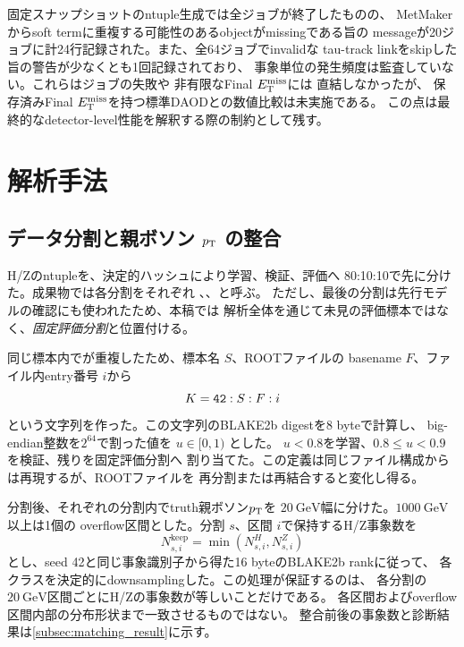 \documentclass[xelatex,ja=standard,a4paper,10pt,twocolumn]{bxjsarticle}
\begin{document}
固定スナップショットのntuple生成では全ジョブが終了したものの、
MetMakerからsoft termに重複する可能性のあるobjectがmissingである旨の
messageが20ジョブに計24行記録された。また、全64ジョブでinvalidな
tau-track linkをskipした旨の警告が少なくとも1回記録されており、
事象単位の発生頻度は監査していない。これらはジョブの失敗や
非有限なFinal \(E_{\mathrm{T}}^{\mathrm{miss}}\)には
直結しなかったが、
保存済みFinal \(E_{\mathrm{T}}^{\mathrm{miss}}\)を持つ標準DAODとの数値比較は未実施である。
この点は最終的なdetector-level性能を解釈する際の制約として残す。

\section{解析手法}
\label{sec:method}

\subsection{データ分割と親ボソン \(p_{\mathrm{T}}\) の整合}
\label{subsec:matching}

H/Zのntupleを、決定的ハッシュにより学習、検証、評価へ
80:10:10で先に分けた。成果物では各分割をそれぞれ
、、と呼ぶ。
ただし、最後の分割は先行モデルの確認にも使われたため、本稿では
解析全体を通じて未見の評価標本ではなく、\emph{固定評価分割}と位置付ける。

同じ標本内でが重複したため、標本名 \(S\)、ROOTファイルの
basename \(F\)、ファイル内entry番号 \(i\)から
\begin{equation}
  K=\code{42}:S:F:i
  \label{eq:split_key}
\end{equation}
という文字列を作った。この文字列のBLAKE2b digestを8 byteで計算し、
big-endian整数を\(2^{64}\)で割った値を \(u\in[0,1)\) とした。
\(u<0.8\)を学習、\(0.8\leq u<0.9\)を検証、残りを固定評価分割へ
割り当てた。この定義は同じファイル構成からは再現するが、ROOTファイルを
再分割または再結合すると変化し得る。

分割後、それぞれの分割内でtruth親ボソン\(p_{\mathrm{T}}\)を
\(\SI{20}{\GeV}\)幅に分けた。\(\SI{1000}{\GeV}\)以上は1個の
overflow区間とした。分割 \(s\)、区間 \(i\)で保持するH/Z事象数を
\begin{equation}
  N^{\mathrm{keep}}_{s,i}
  = \min\left(N^{H}_{s,i},N^{Z}_{s,i}\right)
  \label{eq:pt_matching}
\end{equation}
とし、seed 42と同じ事象識別子から得た16 byteのBLAKE2b rankに従って、
各クラスを決定的にdownsamplingした。この処理が保証するのは、
各分割の\(\SI{20}{\GeV}\)区間ごとにH/Zの事象数が等しいことだけである。
各区間およびoverflow区間内部の分布形状まで一致させるものではない。
整合前後の事象数と診断結果は\cref{subsec:matching_result}に示す。
\end{document}

